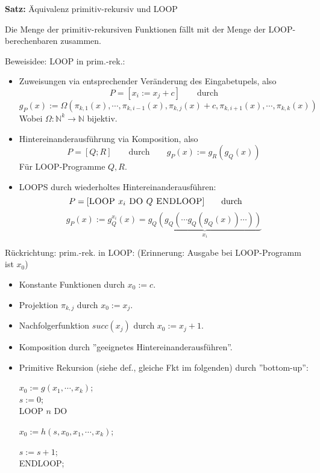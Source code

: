 \documentclass[a4paper,graphics,11pt]{article}
\begin{document}
\strut

\textbf{Satz:} Äquivalenz primitiv-rekursiv und LOOP

Die Menge der primitiv-rekursiven Funktionen fällt mit der Menge der LOOP-berechenbaren zusammen.

Beweisidee: LOOP in prim.-rek.:

\begin{itemize}
    \item Zuweisungen via entsprechender Veränderung des Eingabetupels, also
        $$
            P = [x_i := x_j + c] \qquad\text{durch}
        $$$$
            g_P(x) := \Omega(\pi_{k,1}(x),\cdots,\pi_{k,i-1}(x),\pi_{k,j}(x) + c, \pi_{k,i+1}(x), \cdots, \pi_{k,k}(x))
        $$
        Wobei $\Omega:\mathbb{N}^k \to \mathbb{N}$ bijektiv.
    \item Hintereinanderausführung via Komposition, also
        $$
            P = [Q;R] \qquad\text{durch}\qquad g_P(x) := g_R(g_Q(x))
        $$
        Für LOOP-Programme $Q,R$.
    \item LOOPS durch wiederholtes Hintereinanderausführen:
        $$
            P = [\textsc{LOOP } x_i \textsc{ DO } Q \textsc{ ENDLOOP}]
            \qquad\text{durch}\qquad
        $$$$
            g_P(x) := g_Q^{x_i}(x) = \underbrace{g_Q(g_Q(\cdots g_Q(g_Q(x))\cdots))}_{x_i}
        $$
\end{itemize}

\newpage

Rückrichtung: prim.-rek. in LOOP: (Erinnerung: Ausgabe bei LOOP-Programm ist $x_0$)
\begin{itemize}
    \item Konstante Funktionen durch $x_0 := c$.
    \item Projektion $\pi_{k,j}$ durch $x_0 := x_j$.
    \item Nachfolgerfunktion $succ(x_j)$ durch $x_0 := x_j + 1$.
    \item Komposition durch ''geeignetes Hintereinanderausführen''.
    \item Primitive Rekursion (siehe def., gleiche Fkt im folgenden) durch ''bottom-up'':

        $x_0 := g(x_1,\cdots,x_k)$;\\
        $s := 0$;\\
        \textsc{LOOP} $n$ \textsc{DO}\\
        \strut\qquad$x_0 := h(s,x_0,x_1,\cdots,x_k)$;\\
        \strut\qquad$s := s+1$;\\
        \textsc{ENDLOOP};
\end{itemize}
\end{document}
